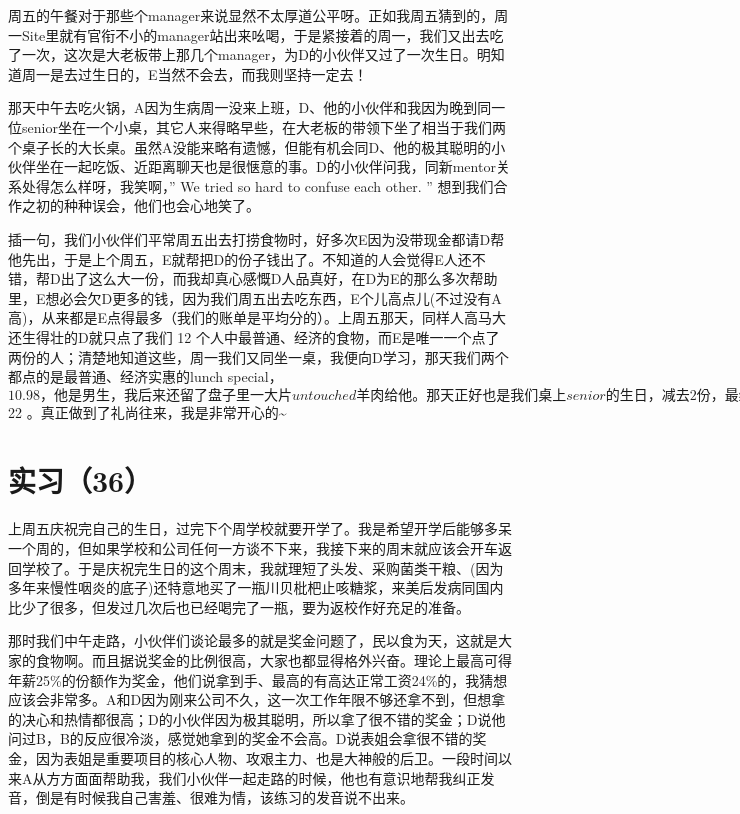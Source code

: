 \documentclass[12pt]{book}
\begin{document}
周五的午餐对于那些个manager来说显然不太厚道公平呀。正如我周五猜到的，周一Site里就有官衔不小的manager站出来吆喝，于是紧接着的周一，我们又出去吃了一次，这次是大老板带上那几个manager，为D的小伙伴又过了一次生日。明知道周一是去过生日的，E当然不会去，而我则坚持一定去！

那天中午去吃火锅，A因为生病周一没来上班，D、他的小伙伴和我因为晚到同一位senior坐在一个小桌，其它人来得略早些，在大老板的带领下坐了相当于我们两个桌子长的大长桌。虽然A没能来略有遗憾，但能有机会同D、他的极其聪明的小伙伴坐在一起吃饭、近距离聊天也是很惬意的事。D的小伙伴问我，同新mentor关系处得怎么样呀，我笑啊，” We tried so hard to confuse each other. ” 想到我们合作之初的种种误会，他们也会心地笑了。

插一句，我们小伙伴们平常周五出去打捞食物时，好多次E因为没带现金都请D帮他先出，于是上个周五，E就帮把D的份子钱出了。不知道的人会觉得E人还不错，帮D出了这么大一份，而我却真心感慨D人品真好，在D为E的那么多次帮助里，E想必会欠D更多的钱，因为我们周五出去吃东西，E个儿高点儿(不过没有A高)，从来都是E点得最多（我们的账单是平均分的）。上周五那天，同样人高马大还生得壮的D就只点了我们 12 个人中最普通、经济的食物，而E是唯一一个点了两份的人；清楚地知道这些，周一我们又同坐一桌，我便向D学习，那天我们两个都点的是最普通、经济实惠的lunch special， $10.98，他是男生，我后来还留了盘子里一大片untouched羊肉给他。那天正好也是我们桌上senior的生日，减去2份，最终我们人均滩了$ 22 。真正做到了礼尚往来，我是非常开心的\textasciitilde{}~


\section{实习（36）}
\label{sec-5-39}

上周五庆祝完自己的生日，过完下个周学校就要开学了。我是希望开学后能够多呆一个周的，但如果学校和公司任何一方谈不下来，我接下来的周末就应该会开车返回学校了。于是庆祝完生日的这个周末，我就理短了头发、采购菌类干粮、(因为多年来慢性咽炎的底子)还特意地买了一瓶川贝枇杷止咳糖浆，来美后发病同国内比少了很多，但发过几次后也已经喝完了一瓶，要为返校作好充足的准备。

那时我们中午走路，小伙伴们谈论最多的就是奖金问题了，民以食为天，这就是大家的食物啊。而且据说奖金的比例很高，大家也都显得格外兴奋。理论上最高可得年薪25\%的份额作为奖金，他们说拿到手、最高的有高达正常工资24\%的，我猜想应该会非常多。A和D因为刚来公司不久，这一次工作年限不够还拿不到，但想拿的决心和热情都很高；D的小伙伴因为极其聪明，所以拿了很不错的奖金；D说他问过B，B的反应很冷淡，感觉她拿到的奖金不会高。D说表姐会拿很不错的奖金，因为表姐是重要项目的核心人物、攻艰主力、也是大神般的后卫。一段时间以来A从方方面面帮助我，我们小伙伴一起走路的时候，他也有意识地帮我纠正发音，倒是有时候我自己害羞、很难为情，该练习的发音说不出来。
\end{document}
